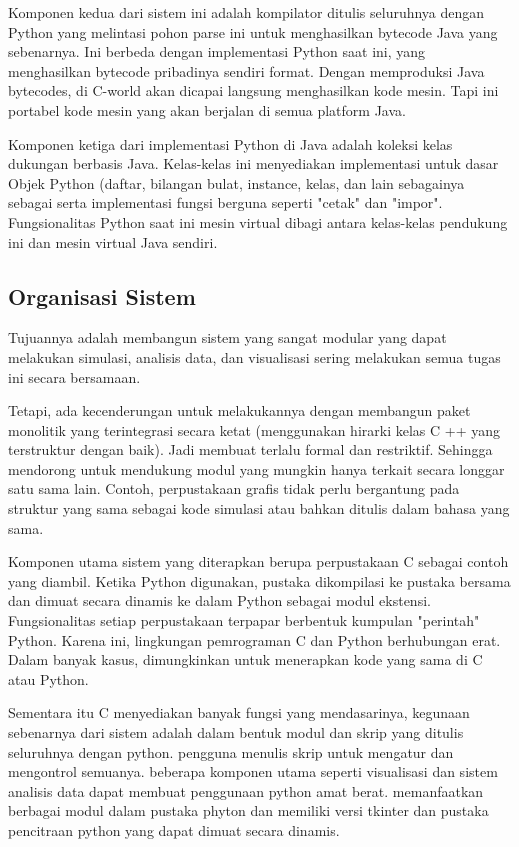 \documentclass[12pt,a4paper]{article}
\begin{document}
Komponen kedua dari sistem ini adalah kompilator ditulis seluruhnya dengan Python yang melintasi pohon parse ini untuk menghasilkan bytecode Java yang sebenarnya. Ini berbeda dengan implementasi Python saat ini, yang menghasilkan bytecode pribadinya sendiri format. Dengan memproduksi Java bytecodes, di C-world akan dicapai langsung menghasilkan kode mesin. Tapi ini portabel kode mesin yang akan berjalan di semua platform Java.

Komponen ketiga dari implementasi Python di Java adalah koleksi kelas dukungan berbasis Java. Kelas-kelas ini menyediakan implementasi untuk dasar Objek Python (daftar, bilangan bulat, instance, kelas, dan lain sebagainya sebagai serta implementasi fungsi berguna seperti "cetak" dan "impor". Fungsionalitas Python saat ini mesin virtual dibagi antara kelas-kelas pendukung ini dan mesin virtual Java sendiri.

\subsection{Organisasi Sistem}

Tujuannya adalah membangun sistem yang sangat modular yang dapat melakukan simulasi, analisis data, dan visualisasi sering melakukan semua tugas ini secara bersamaan. 

Tetapi, ada kecenderungan untuk melakukannya dengan membangun paket monolitik yang terintegrasi secara ketat (menggunakan hirarki kelas C ++ yang terstruktur dengan baik). Jadi membuat  terlalu formal dan restriktif.  Sehingga mendorong untuk mendukung modul yang mungkin hanya terkait secara longgar satu sama lain. Contoh, perpustakaan grafis tidak perlu bergantung pada struktur yang sama sebagai kode simulasi atau bahkan ditulis dalam bahasa yang sama.

Komponen utama sistem yang diterapkan  berupa perpustakaan C sebagai contoh yang diambil. Ketika Python digunakan, pustaka dikompilasi ke pustaka bersama dan dimuat secara dinamis ke dalam Python sebagai modul ekstensi. Fungsionalitas setiap perpustakaan terpapar berbentuk kumpulan "perintah" Python. Karena ini, lingkungan pemrograman C dan Python berhubungan erat. Dalam banyak kasus, dimungkinkan untuk menerapkan kode yang sama di C atau Python. 

Sementara itu C menyediakan banyak fungsi yang mendasarinya, kegunaan sebenarnya dari sistem adalah dalam bentuk modul dan skrip yang ditulis seluruhnya dengan python. pengguna menulis skrip untuk mengatur dan mengontrol semuanya. beberapa komponen utama seperti visualisasi dan sistem analisis data dapat membuat penggunaan python amat berat. memanfaatkan berbagai modul dalam pustaka phyton dan memiliki versi tkinter dan pustaka pencitraan python yang dapat dimuat secara dinamis.
\end{document}
